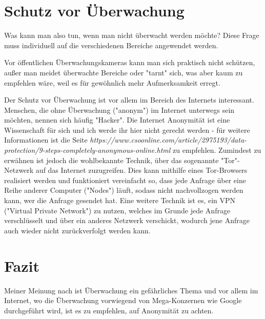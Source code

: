 \documentclass{article}
\begin{document}
\section{Schutz vor Überwachung}
\label{sec:Schutz vor Ueberwachung}
Was kann man also tun, wenn man nicht überwacht werden möchte? Diese Frage muss individuell auf die verschiedenen Bereiche angewendet werden.

Vor öffentlichen Überwachungskameras kann man sich praktisch nicht schützen, außer man meidet überwachte Bereiche oder "tarnt" sich, was aber kaum zu empfehlen wäre, weil es für gewöhnlich mehr Aufmerksamkeit erregt.

Der Schutz vor Überwachung ist vor allem im Bereich des Internets interessant. Menschen, die ohne Überwachung ("anonym") im Internet unterwegs sein möchten, nennen sich häufig "Hacker". Die Internet Anonymität ist eine Wissenschaft für sich und ich werde ihr hier nicht gerecht werden - für weitere Informationen ist die Seite \textit{https://www.csoonline.com/article/2975193/data-protection/9-steps-completely-anonymous-online.html} zu empfehlen. Zumindest zu erwähnen ist jedoch die wohlbekannte Technik, über das sogenannte "Tor"-Netzwerk auf das Internet zuzugreifen. Dies kann mithilfe eines Tor-Browsers realisiert werden und funktioniert vereinfacht so, dass jede Anfrage über eine Reihe anderer Computer ("Nodes") läuft, sodass nicht nachvollzogen werden kann, wer die Anfrage gesendet hat.
Eine weitere Technik ist es, ein VPN ("Virtual Private Network") zu nutzen, welches im Grunde jede Anfrage verschlüsselt und über ein anderes Netzwerk verschickt, wodurch jene Anfrage auch wieder nicht zurückverfolgt werden kann.

\section{Fazit}
Meiner Meinung nach ist Überwachung ein gefährliches Thema und vor allem im Internet, wo die Überwachung vorwiegend von Mega-Konzernen wie Google durchgeführt wird, ist es zu empfehlen, auf Anonymität zu achten.

\newpage
\printbibliography
\end{document}

